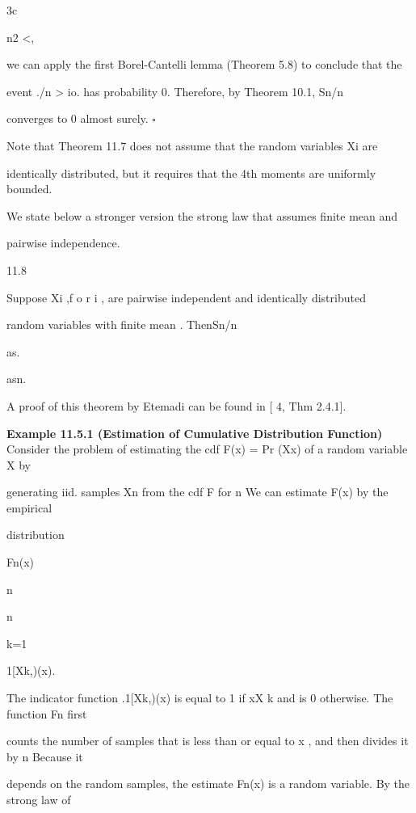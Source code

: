 3c

n2 <\infty ,

we can apply the first Borel-Cantelli lemma (Theorem 5.8) to conclude that the

event .{\vertSn\vert/n > \epsilon io. } has probability 0. Therefore, by Theorem 10.1, Sn/n

converges to 0 almost surely. \hfill $\square$

Note that Theorem 11.7 does not assume that the random variables Xi are

identically distributed, but it requires that the 4th moments are uniformly bounded.

We state below a stronger version the strong law that assumes finite mean and

pairwise independence.

\begin{thmbox}{11.8}
\end{thmbox}

Suppose Xi ,f o r i , are pairwise independent and identically distributed

random variables with finite mean \mu. ThenSn/n

as.

\to \mu asn\to\infty .

A proof of this theorem by Etemadi can be found in [ 4, Thm 2.4.1].

\textbf{Example 11.5.1 (Estimation of Cumulative Distribution Function)} \\

Consider the problem of estimating the cdf F(x) = Pr (X\leq x) of a random variable X by

generating iid. samples Xn from the cdf F for n We can estimate F(x) by the empirical

distribution

Fn(x)

n

n\sum

k=1

1[Xk,\infty )(x).

The indicator function .1[Xk,\infty )(x) is equal to 1 if x\geq X k and is 0 otherwise. The function Fn first

counts the number of samples that is less than or equal to x , and then divides it by n Because it

depends on the random samples, the estimate Fn(x) is a random variable. By the strong law of

